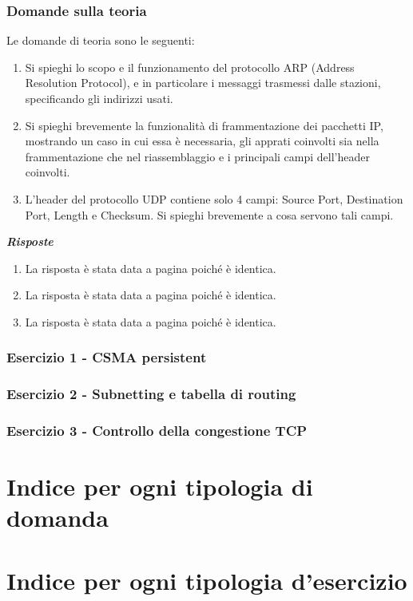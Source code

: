 \documentclass[a4paper]{article}
\begin{document}
	\subsubsection{Domande sulla teoria}
	Le domande di teoria sono le seguenti:
	\begin{enumerate}
		\item Si spieghi lo scopo e il funzionamento del protocollo ARP (Address Resolution Protocol), e in particolare i messaggi trasmessi dalle stazioni, specificando gli indirizzi usati.
		
		\item Si spieghi brevemente la funzionalità di frammentazione dei pacchetti IP, mostrando un caso in cui essa è necessaria, gli apprati coinvolti sia nella frammentazione che nel riassemblaggio e i principali campi dell'header coinvolti.
		
		\item L'header del protocollo UDP contiene solo 4 campi: Source Port, Destination Port, Length e Checksum. Si spieghi brevemente a cosa servono tali campi.
	\end{enumerate}
	\textcolor{Green4}{\textbf{\emph{Risposte}}}
	\begin{enumerate}
		\item La risposta è stata data a pagina \pageref{ARP} poiché è identica.
		
		\item La risposta è stata data a pagina \pageref{frammentazione IP} poiché è identica.
		
		\item La risposta è stata data a pagina \pageref{header UDP} poiché è identica.
	\end{enumerate}
	
	\subsubsection{Esercizio 1 - CSMA persistent}
	
	\subsubsection{Esercizio 2 - Subnetting e tabella di routing}
	
	\subsubsection{Esercizio 3 - Controllo della congestione TCP}
	
	\newpage

	\section{Indice per ogni tipologia di domanda}

	\section{Indice per ogni tipologia d'esercizio}
\end{document}
